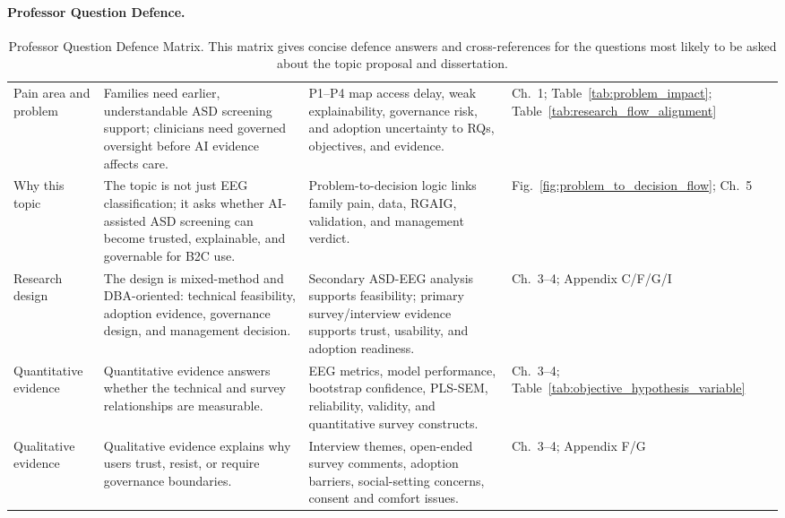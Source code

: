 \paragraph{Professor Question Defence.}




{\tablestripes\tablefontsize
{}
\begin{xltabular}{\textwidth}{@{} >{\raggedright\arraybackslash}p{2.1cm} p{5.0cm} p{5.0cm} >{\raggedright\arraybackslash}p{2.1cm} @{}}
\caption[Professor Question Defence Matrix]{Professor Question Defence Matrix. This matrix gives concise defence answers and cross-references for the questions most likely to be asked about the topic proposal and dissertation.}\label{tab:professor_question_defence_matrix} \\
\toprule
{} &  &  &  \\
\midrule
\endfirsthead
\endhead
\bottomrule
\endlastfoot
Pain area and problem & Families need earlier, understandable ASD screening support; clinicians need governed oversight before AI evidence affects care. & P1--P4 map access delay, weak explainability, governance risk, and adoption uncertainty to RQs, objectives, and evidence. & Ch.~1; Table~\ref{tab:problem_impact}; Table~\ref{tab:research_flow_alignment} \\
\addlinespace
Why this topic & The topic is not just EEG classification; it asks whether AI-assisted ASD screening can become trusted, explainable, and governable for B2C use. & Problem-to-decision logic links family pain, data, RGAIG, validation, and management verdict. & Fig.~\ref{fig:problem_to_decision_flow}; Ch.~5 \\
\addlinespace
Research design & The design is mixed-method and DBA-oriented: technical feasibility, adoption evidence, governance design, and management decision. & Secondary ASD-EEG analysis supports feasibility; primary survey/interview evidence supports trust, usability, and adoption readiness. & Ch.~3--4; Appendix C/F/G/I \\
\addlinespace
Quantitative evidence & Quantitative evidence answers whether the technical and survey relationships are measurable. & EEG metrics, model performance, bootstrap confidence, PLS-SEM, reliability, validity, and quantitative survey constructs. & Ch.~3--4; Table~\ref{tab:objective_hypothesis_variable} \\
\addlinespace
Qualitative evidence & Qualitative evidence explains why users trust, resist, or require governance boundaries. & Interview themes, open-ended survey comments, adoption barriers, social-setting concerns, consent and comfort issues. & Ch.~3--4; Appendix F/G \\

\end{xltabular}}
